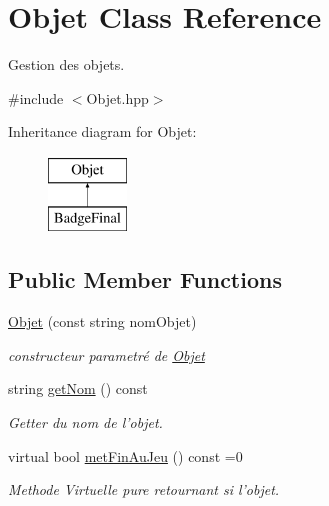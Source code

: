 \hypertarget{classObjet}{\section{Objet Class Reference}
\label{classObjet}
}


Gestion des objets.  




{\ttfamily \#include $<$Objet.\-hpp$>$}

Inheritance diagram for Objet\-:\begin{figure}[H]
\begin{center}
\leavevmode
\includegraphics[height=2.000000cm]{classObjet}
\end{center}
\end{figure}
\subsection*{Public Member Functions}
\begin{DoxyCompactItemize}
\item 
\hyperlink{classObjet_ab9b72f8c1cb2af52c0b9e334126c361e}{Objet} (const string nom\-Objet)
\begin{DoxyCompactList}\small\item\em constructeur parametré de \hyperlink{classObjet}{Objet} \end{DoxyCompactList}\item 
\hypertarget{classObjet_ae69f82c5eb6d573032ac1f6e548cdb00}{string \hyperlink{classObjet_ae69f82c5eb6d573032ac1f6e548cdb00}{get\-Nom} () const }\label{classObjet_ae69f82c5eb6d573032ac1f6e548cdb00}

\begin{DoxyCompactList}\small\item\em Getter du nom de l'objet. \end{DoxyCompactList}\item 
\hypertarget{classObjet_ad25b7793754858f839119f0c812fc9b8}{virtual bool \hyperlink{classObjet_ad25b7793754858f839119f0c812fc9b8}{met\-Fin\-Au\-Jeu} () const =0}\label{classObjet_ad25b7793754858f839119f0c812fc9b8}

\begin{DoxyCompactList}\small\item\em Methode Virtuelle pure retournant si l'objet. \end{DoxyCompactList}\end{DoxyCompactItemize}


